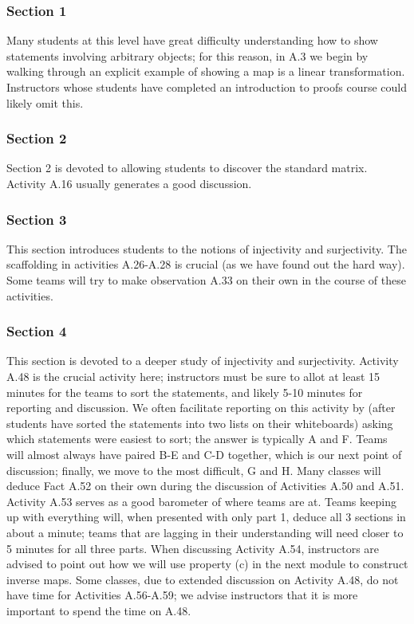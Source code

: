 \documentclass{article}
\begin{document}
\subsubsection*{Section 1}
Many students at this level have great difficulty understanding how to show statements involving arbitrary objects; for this reason, in A.3 we begin by walking through an explicit example of showing a map is a linear transformation.  Instructors whose students have completed an introduction to proofs course could likely omit this.  

\subsubsection*{Section 2}
Section 2 is devoted to allowing students to discover the standard matrix.  Activity A.16 usually generates a good discussion.  

\subsubsection*{Section 3}
This section introduces students to the notions of injectivity and surjectivity.  The scaffolding in activities A.26-A.28 is crucial (as we have found out the hard way).  Some teams will try to make observation A.33  on their own in the course of these activities.  

\subsubsection*{Section 4}
This section is devoted to a deeper study of injectivity and surjectivity.  Activity A.48 is the crucial activity here; instructors must be sure to allot at least 15 minutes for the teams to sort the statements, and likely 5-10 minutes for reporting and discussion.  We often facilitate reporting on this activity by (after students have sorted the statements into two lists on their whiteboards) asking which statements were easiest to sort; the answer is typically A and F.  Teams will almost always have paired B-E and C-D together, which is our next point of discussion; finally, we move to the most difficult, G and H.  Many classes will deduce Fact A.52 on their own during the discussion of Activities A.50 and A.51.  Activity A.53 serves as a good barometer of where teams are at.  Teams keeping up with everything will, when presented with only part 1, deduce all 3 sections in about a minute; teams that are lagging in their understanding will need closer to 5 minutes for all three parts.  When discussing Activity A.54, instructors are advised to point out how we will use property (c) in the next module to construct inverse maps.  Some classes, due to extended discussion on Activity A.48, do not have time for Activities A.56-A.59; we advise instructors that it is more important to spend the time on A.48.
\end{document}

